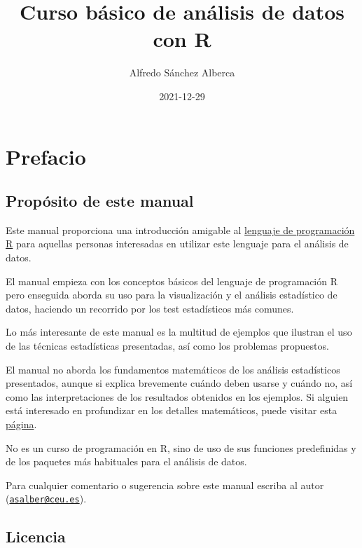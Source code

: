 \documentclass[
]{book}
\title{Curso básico de análisis de datos con R}
\author{Alfredo Sánchez Alberca}
\date{2021-12-29}
\theoremstyle{definition}
\theoremstyle{definition}
\theoremstyle{definition}
\theoremstyle{definition}
\theoremstyle{remark}
\begin{document}
\maketitle

{
\setcounter{tocdepth}{1}
\tableofcontents
}
\hypertarget{prefacio}{%
\chapter*{Prefacio}\label{prefacio}}

\hypertarget{propuxf3sito-de-este-manual}{%
\section*{Propósito de este manual}\label{propuxf3sito-de-este-manual}}

Este manual proporciona una introducción amigable al \href{https://www.r-project.org/}{lenguaje de programación R} para aquellas personas interesadas en utilizar este lenguaje para el análisis de datos.

El manual empieza con los conceptos básicos del lenguaje de programación R pero enseguida aborda su uso para la visualización y el análisis estadístico de datos, haciendo un recorrido por los test estadísticos más comunes.

Lo más interesante de este manual es la multitud de ejemplos que ilustran el uso de las técnicas estadísticas presentadas, así como los problemas propuestos.

El manual no aborda los fundamentos matemáticos de los análisis estadísticos presentados, aunque si explica brevemente cuándo deben usarse y cuándo no, así como las interpretaciones de los resultados obtenidos en los ejemplos. Si alguien está interesado en profundizar en los detalles matemáticos, puede visitar esta \href{https://aprendeconalf.es/docencia/estadistica/}{página}.

No es un curso de programación en R, sino de uso de sus funciones predefinidas y de los paquetes más habituales para el análisis de datos.

Para cualquier comentario o sugerencia sobre este manual escriba al autor (\href{mailto:asalber@ceu.es}{\nolinkurl{asalber@ceu.es}}).

\hypertarget{licencia}{%
\section*{Licencia}\label{licencia}}
\end{document}

